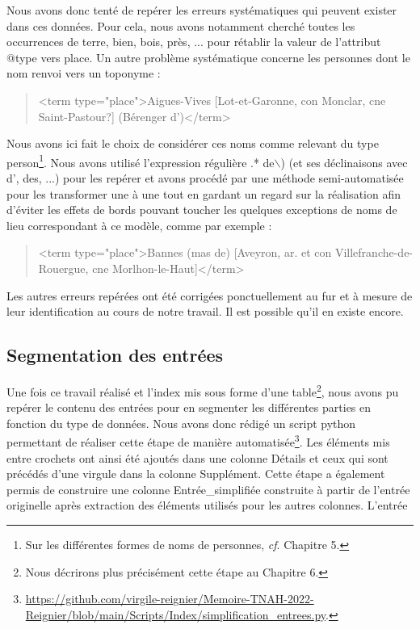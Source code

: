 \documentclass[a4paper,12pt,twoside]{book}
\begin{document}
	\noindent Nous avons donc tenté de repérer les erreurs systématiques qui peuvent exister dans ces données. Pour cela, nous avons notamment cherché toutes les occurrences de \og terre\fg{}, \og bien\fg{}, \og bois\fg{}, \og près\fg{}, ... pour rétablir la valeur de l'attribut @type vers \og place\fg{}. Un autre problème systématique concerne les personnes dont le nom renvoi vers un toponyme :
	
	\begin{quotation}
		<term type="place">Aigues-Vives [Lot-et-Garonne, con Monclar, cne Saint-Pastour?]
			(Bérenger d')</term>
	\end{quotation}

	\noindent Nous avons ici fait le choix de considérer ces noms comme relevant du type \og person\fg{}\footnote{Sur les différentes formes de noms de personnes, \textit{cf}. Chapitre 5.}. Nous avons utilisé l'expression régulière \og [A-Z].* de$\backslash$)\fg{} (et ses déclinaisons avec \og d'\fg{}, \og des\fg{}, ...) pour les repérer et avons procédé par une méthode semi-automatisée pour les transformer une à une tout en gardant un regard sur la réalisation afin d'éviter les effets de bords pouvant toucher les quelques exceptions de noms de lieu correspondant à ce modèle, comme par exemple :
	
	\begin{quotation}
    	<term type="place">Bannes (mas de) [Aveyron, ar. et con Villefranche-de-Rouergue,
			cne Morlhon-le-Haut]</term>
	\end{quotation}
	
	\noindent Les autres erreurs repérées ont été corrigées ponctuellement au fur et à mesure de leur identification au cours de notre travail. Il est possible qu'il en existe encore.
	
	\subsection{Segmentation des entrées}
	
	Une fois ce travail réalisé et l'index mis sous forme d'une table\footnote{Nous décrirons plus précisément cette étape au Chapitre 6.}, nous avons pu repérer le contenu des entrées pour en segmenter les différentes parties en fonction du type de données. Nous avons donc rédigé un script python permettant de réaliser cette étape de manière automatisée\footnote{\url{https://github.com/virgile-reignier/Memoire-TNAH-2022-Reignier/blob/main/Scripts/Index/simplification_entrees.py}.}. Les éléments mis entre crochets ont ainsi été ajoutés dans une colonne \og Détails\fg{} et ceux qui sont précédés d'une virgule dans la colonne \og Supplément\fg{}. Cette étape a également permis de construire une colonne \og Entrée\_simplifiée\fg{} construite à partir de l'entrée originelle après extraction des éléments utilisés pour les autres colonnes. L'entrée 
	
\end{document}

